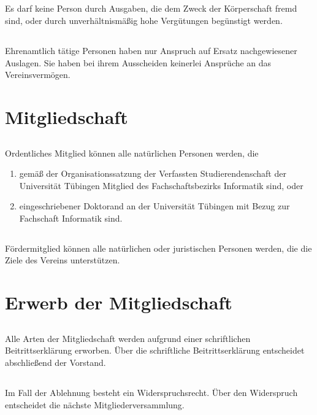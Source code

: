 \documentclass[12pt]{article}
\begin{document}
\subsection{}
Es darf keine Person durch Ausgaben, die dem Zweck der Körperschaft fremd sind, oder durch unverhältnismäßig hohe Vergütungen begünstigt werden.
\subsection{}
Ehrenamtlich tätige Personen haben nur Anspruch auf Ersatz nachgewiesener Auslagen. Sie haben bei ihrem Ausscheiden keinerlei Ansprüche an das Vereinsvermögen.

\section{Mitgliedschaft}
\label{mitgliedschaft}
\subsection{}
\label{mitgliedschaft:1}
Ordentliches Mitglied können alle natürlichen Personen werden, die 
\begin{enumerate}
    \item gemäß der Organisationssatzung der Verfassten Studierendenschaft der Universität Tübingen Mitglied des Fachschaftsbezirks Informatik sind, oder
    \item eingeschriebener Doktorand an der Universität Tübingen mit Bezug zur Fachschaft Informatik sind.
\end{enumerate}
\subsection{}
Fördermitglied können alle natürlichen oder juristischen Personen werden, die die Ziele des Vereins unterstützen.

\section{Erwerb der Mitgliedschaft}
\subsection{}
Alle Arten der Mitgliedschaft werden aufgrund einer schriftlichen Beitrittserklärung erworben. Über die schriftliche Beitrittserklärung entscheidet abschließend der Vorstand.
\subsection{}
Im Fall der Ablehnung besteht ein Widerspruchsrecht. Über den Widerspruch entscheidet die nächste Mitgliederversammlung.
\end{document}
